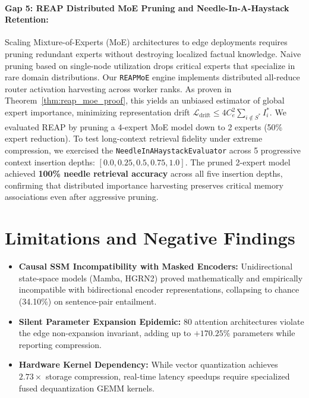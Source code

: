 \documentclass{article}
\begin{document}
\paragraph{Gap 5: REAP Distributed MoE Pruning and Needle-In-A-Haystack Retention:}
Scaling Mixture-of-Experts (MoE) architectures to edge deployments requires pruning redundant experts without destroying localized factual knowledge. Naive pruning based on single-node utilization drops critical experts that specialize in rare domain distributions. 
Our \texttt{REAPMoE} engine implements distributed all-reduce router activation harvesting across worker ranks. As proven in Theorem~\ref{thm:reap_moe_proof}, this yields an unbiased estimator of global expert importance, minimizing representation drift $\mathcal{L}_{\text{drift}} \le 4 C_e^2 \sum_{i \notin S^*} I_i^*$. 
We evaluated REAP by pruning a 4-expert MoE model down to 2 experts (50\% expert reduction). To test long-context retrieval fidelity under extreme compression, we exercised the \texttt{NeedleInAHaystackEvaluator} across 5 progressive context insertion depths: $[0.0, 0.25, 0.5, 0.75, 1.0]$. The pruned 2-expert model achieved \textbf{100\% needle retrieval accuracy} across all five insertion depths, confirming that distributed importance harvesting preserves critical memory associations even after aggressive pruning.

\section{Limitations and Negative Findings}
\label{sec:limitations}

\begin{itemize}
    \item \textbf{Causal SSM Incompatibility with Masked Encoders:} Unidirectional state-space models (Mamba, HGRN2) proved mathematically and empirically incompatible with bidirectional encoder representations, collapsing to chance (34.10\%) on sentence-pair entailment.
    \item \textbf{Silent Parameter Expansion Epidemic:} 80 attention architectures violate the edge non-expansion invariant, adding up to $+170.25\%$ parameters while reporting compression.
    \item \textbf{Hardware Kernel Dependency:} While vector quantization achieves $2.73\times$ storage compression, real-time latency speedups require specialized fused dequantization GEMM kernels.
\end{itemize}
\end{document}

